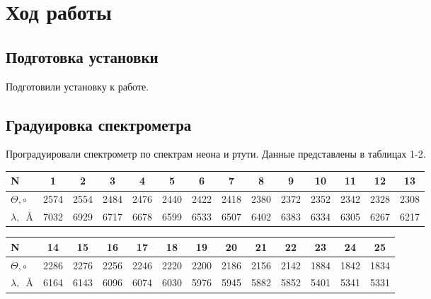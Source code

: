 

\section{Ход работы}

\subsection{Подготовка установки}

Подготовили установку к работе.

\subsection{Градуировка спектрометра}

Проградуировали спектрометр по спектрам неона и ртути. Данные представлены в таблицах 1-2.

\begin{table}[h!]
    \begin{center}

        \begin{tabular}{|l|c|c|c|c|c|c|c|c|c|c|c|c|c|}
        \hline
        N                   & 1    & 2    & 3    & 4    & 5    & 6    & 7    & 8    & 9    & 10   & 11   & 12   & 13   \\ \hline
        $ \Theta, \circ $   & 2574 & 2554 & 2484 & 2476 & 2440 & 2422 & 2418 & 2380 & 2372 & 2352 & 2342 & 2328 & 2308 \\ \hline
        $ \lambda, \, $ \AA & 7032 & 6929 & 6717 & 6678 & 6599 & 6533 & 6507 & 6402 & 6383 & 6334 & 6305 & 6267 & 6217 \\ \hline
        \end{tabular}




        \vspace{0.4cm}

        \begin{tabular}{|l|c|c|c|c|c|c|c|c|c|c|c|c|}
        \hline
        N                   & 14   & 15   & 16   & 17   & 18   & 19   & 20   & 21   & 22   & 23   & 24   & 25   \\ \hline
        $ \Theta, \circ $   & 2286 & 2276 & 2256 & 2246 & 2220 & 2200 & 2186 & 2156 & 2142 & 1884 & 1842 & 1834 \\ \hline
        $ \lambda, \, $ \AA & 6164 & 6143 & 6096 & 6074 & 6030 & 5976 & 5945 & 5882 & 5852 & 5401 & 5341 & 5331 \\ \hline
        \end{tabular}

    \end{center}
\end{table}

